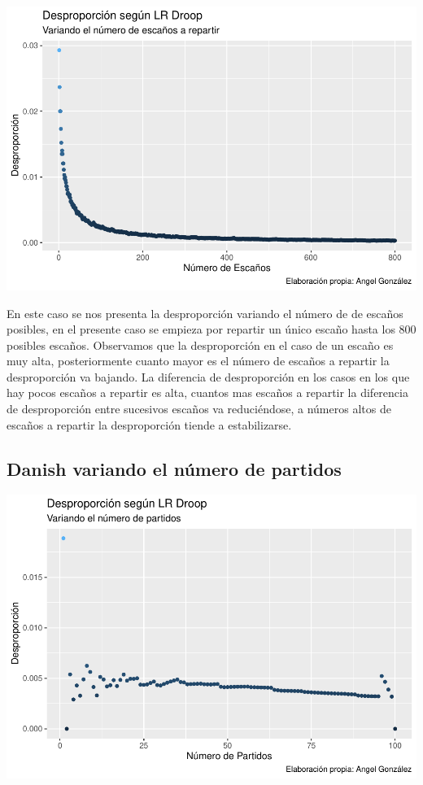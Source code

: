 \documentclass[12pt,a4paper,]{book}
\numberwithin{dummy}{section}
\theoremstyle{ocrenumbox}
\theoremstyle{blacknumex}
\theoremstyle{blacknumbox}
\theoremstyle{ocrenum}
\theoremstyle{ocrenum}
\begin{document}
\begin{center}\includegraphics[width=0.95\linewidth]{figurasR/unnamed-chunk-46-1} \end{center}

En este caso se nos presenta la desproporción variando el número de de
escaños posibles, en el presente caso se empieza por repartir un único
escaño hasta los 800 posibles escaños. Observamos que la desproporción
en el caso de un escaño es muy alta, posteriormente cuanto mayor es el
número de escaños a repartir la desproporción va bajando. La diferencia
de desproporción en los casos en los que hay pocos escaños a repartir es
alta, cuantos mas escaños a repartir la diferencia de desproporción
entre sucesivos escaños va reduciéndose, a números altos de escaños a
repartir la desproporción tiende a estabilizarse.

\hypertarget{danish-variando-el-nuxfamero-de-partidos}{%
\subsection{Danish variando el número de
partidos}\label{danish-variando-el-nuxfamero-de-partidos}}

\begin{center}\includegraphics[width=0.95\linewidth]{figurasR/unnamed-chunk-47-1} \end{center}
\end{document}
